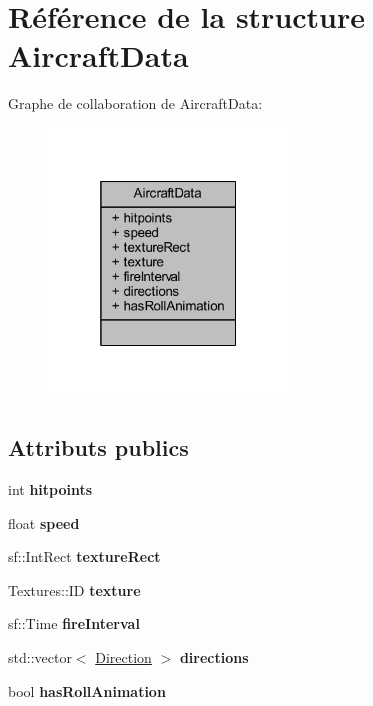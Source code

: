 \hypertarget{struct_aircraft_data}{}\section{Référence de la structure Aircraft\+Data}
\label{struct_aircraft_data}


Graphe de collaboration de Aircraft\+Data\+:\nopagebreak
\begin{figure}[H]
\begin{center}
\leavevmode
\includegraphics[width=181pt]{struct_aircraft_data__coll__graph}
\end{center}
\end{figure}
\subsection*{Attributs publics}
\begin{DoxyCompactItemize}
\item 
\hypertarget{struct_aircraft_data_ad2e89a12ab581641e79e97698c4bb751}{}\label{struct_aircraft_data_ad2e89a12ab581641e79e97698c4bb751} 
int {\bfseries hitpoints}
\item 
\hypertarget{struct_aircraft_data_a2edc576e968bfb7564f126010f85ca98}{}\label{struct_aircraft_data_a2edc576e968bfb7564f126010f85ca98} 
float {\bfseries speed}
\item 
\hypertarget{struct_aircraft_data_a8d6ac75aa2570404ee6b13c5d2128996}{}\label{struct_aircraft_data_a8d6ac75aa2570404ee6b13c5d2128996} 
sf\+::\+Int\+Rect {\bfseries texture\+Rect}
\item 
\hypertarget{struct_aircraft_data_a9c7f1508f44e99fd9376a2a8822f84a9}{}\label{struct_aircraft_data_a9c7f1508f44e99fd9376a2a8822f84a9} 
Textures\+::\+ID {\bfseries texture}
\item 
\hypertarget{struct_aircraft_data_a91ccdace300d5621ce8559b49fcb2efb}{}\label{struct_aircraft_data_a91ccdace300d5621ce8559b49fcb2efb} 
sf\+::\+Time {\bfseries fire\+Interval}
\item 
\hypertarget{struct_aircraft_data_a780a62ab0fb00cb4a01a5c539dcd06c3}{}\label{struct_aircraft_data_a780a62ab0fb00cb4a01a5c539dcd06c3} 
std\+::vector$<$ \hyperlink{struct_direction}{Direction} $>$ {\bfseries directions}
\item 
\hypertarget{struct_aircraft_data_aa9a2b05b21a194b31ff09b3604b56e39}{}\label{struct_aircraft_data_aa9a2b05b21a194b31ff09b3604b56e39} 
bool {\bfseries has\+Roll\+Animation}
\end{DoxyCompactItemize}


